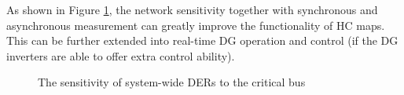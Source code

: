 \documentclass{article}
\begin{document}
As shown in Figure \ref{fig:dha}, the network sensitivity together with synchronous and asynchronous measurement can greatly improve the functionality of HC maps. This can be further extended into real-time DG operation and control (if the DG inverters are able to offer extra control ability). 
\begin{figure}[h!]
    \centering
    \quad
    \caption{The sensitivity of system-wide DERs to the critical bus}
    \label{fig:dha}
\end{figure}
\end{document}
